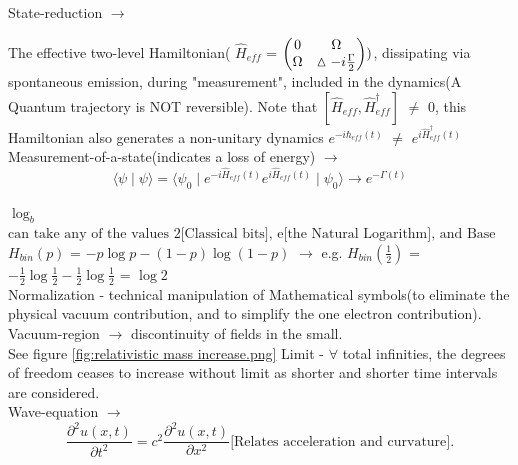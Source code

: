 \documentclass[a4paper, 10pt, onepage]{elegantbook}
\begin{document}
{State-reduction $\longrightarrow$

The effective two-level Hamiltonian( $\hat H_{eff}$ = $\begin{pmatrix}0 & \Omega \cr \Omega & \vartriangle - i \frac{\Gamma}{2} \end{pmatrix} )$, dissipating via spontaneous emission, during "measurement", included in the dynamics(A Quantum trajectory is NOT reversible).
Note that $[\hat H_{eff}, \hat H^\dagger_{eff}]$ $\neq$ 0, this Hamiltonian also generates a non-unitary dynamics $e^{- i \hbar_{eff}(t)}$ $\neq$ $e^{i \hat H^\dagger_{eff}(t)}$  \\

Measurement-of-a-state(indicates a loss of energy) $\longrightarrow$
\begin{equation}
\langle \psi \mid \psi \rangle = \langle \psi_0 \mid e^{- i \hat H_{eff}(t)} e^{i \hat H_{eff}(t)} \mid \psi_0 \rangle \rightarrow e^{- \Gamma(t)}
\end{equation}
\noindent

$\log_b$ $\text{can take any of the values 2[Classical bits], e[the Natural Logarithm], and Base 10[orders of magnitude]}$ \\

$H_{bin}(p)$ = $ -p \log p - (1 - p) \log (1 - p)$ $\rightarrow$ e.g. $H_{bin}(\frac{1}{2})$ = $ - \frac{1}{2} \log \frac{1}{2} - \frac{1}{2} \log \frac{1}{2}$ = $\log 2$  \\

Normalization - technical manipulation of Mathematical symbols(to
eliminate the physical vacuum contribution, and to simplify the one electron contribution).  \\
 
Vacuum-region $\rightarrow$ discontinuity of fields in the small. \\ 

See figure \ref{fig:relativistic mass increase.png} \quad Limit - $\forall$ total infinities, the degrees of freedom ceases to increase
without limit as shorter and shorter time intervals are considered. \\

Wave-equation $\longrightarrow$
\begin{equation}
\frac{\partial^2u(x,t)}{\partial t^2} = c^2 \frac{\partial^2 u(x,t)}{\partial x^2}  \text{[Relates acceleration and curvature].}
\end{equation}
  
}
\end{document}

